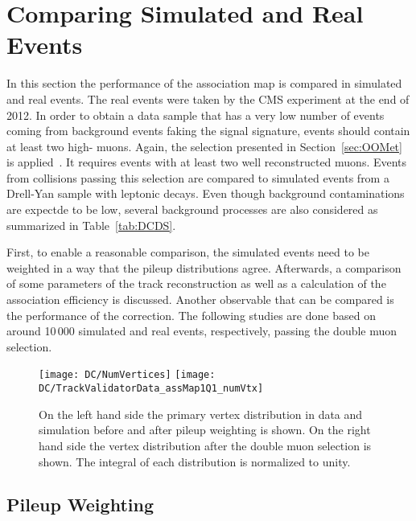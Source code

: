 \chapter{Comparing Simulated and Real Events \label{sec:DC}}

In this section the performance of the association map is compared in simulated and real events. The real events were taken by the CMS experiment at the end of 2012. In order to obtain a data sample that has a very low number of events coming from background events faking the signal signature, events should contain at least two high-\pt{} muons. Again, the selection presented in Section~\ref{sec:OOMet} is applied~\cite{CMS-PAS-JME-12-002}. It requires events with at least two well reconstructed muons. Events from collisions passing this selection are compared to simulated events from a Drell-Yan sample with leptonic decays. Even though background contaminations are expectde to be low, several background processes are also considered as summarized in Table~\ref{tab:DCDS}.



First, to enable a reasonable comparison, the simulated events need to be weighted in a way that the pileup distributions agree. Afterwards, a comparison of some parameters of the track reconstruction as well as a calculation of the association efficiency is discussed. Another observable that can be compared is the performance of the \MET{} correction. The following studies are done based on around 10\,000 simulated and real events, respectively, passing the double muon selection.

\begin{figure}[Hb]
    \centering
    \texttt{[image: DC/NumVertices]}
    \texttt{[image: DC/TrackValidatorData\_assMap1Q1\_numVtx]}
    \caption[Vertex distribution in data and simulation before and after pileup weighting and after double muon trigger]{On the left hand side the primary vertex distribution in data and simulation before and after pileup weighting is shown. On the right hand side the vertex distribution after the double muon selection is shown. The integral of each distribution is normalized to unity. \label{plot:DCPW}}
\end{figure}

\section{Pileup Weighting \label{sec:DCPW}}

